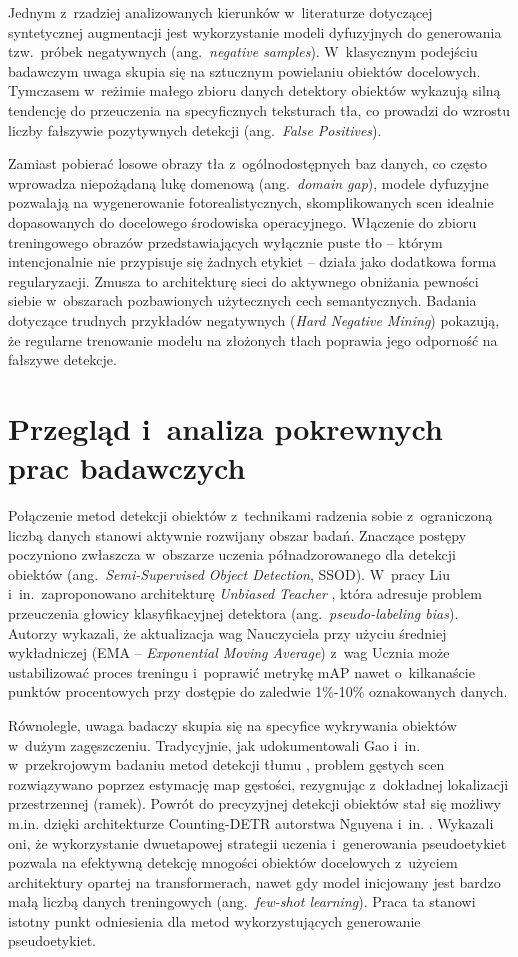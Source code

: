 Jednym z~rzadziej analizowanych kierunków w~literaturze dotyczącej syntetycznej augmentacji jest wykorzystanie modeli dyfuzyjnych do generowania tzw.\ próbek negatywnych (ang.\ \emph{negative samples}). W~klasycznym podejściu badawczym uwaga skupia się na sztucznym powielaniu obiektów docelowych. Tymczasem w~reżimie małego zbioru danych detektory obiektów wykazują silną tendencję do przeuczenia na specyficznych teksturach tła, co prowadzi do wzrostu liczby fałszywie pozytywnych detekcji (ang.\ \emph{False Positives}).

Zamiast pobierać losowe obrazy tła z~ogólnodostępnych baz danych, co często wprowadza niepożądaną lukę domenową (ang.\ \emph{domain gap}), modele dyfuzyjne pozwalają na wygenerowanie fotorealistycznych, skomplikowanych scen idealnie dopasowanych do docelowego środowiska operacyjnego. Włączenie do zbioru treningowego obrazów przedstawiających wyłącznie puste tło -- którym intencjonalnie nie przypisuje się żadnych etykiet -- działa jako dodatkowa forma regularyzacji. Zmusza to architekturę sieci do aktywnego obniżania pewności siebie w~obszarach pozbawionych użytecznych cech semantycznych. Badania dotyczące trudnych przykładów negatywnych (\emph{Hard Negative Mining}) \cite{Shrivastava2016} pokazują, że regularne trenowanie modelu na złożonych tłach poprawia jego odporność na fałszywe detekcje.

\section{Przegląd i~analiza pokrewnych prac badawczych}

Połączenie metod detekcji obiektów z~technikami radzenia sobie z~ograniczoną liczbą danych stanowi aktywnie rozwijany obszar badań. Znaczące postępy poczyniono zwłaszcza w~obszarze uczenia półnadzorowanego dla detekcji obiektów (ang.\ \emph{Semi-Supervised Object Detection}, SSOD). W~pracy Liu i~in.\ zaproponowano architekturę \emph{Unbiased Teacher} \cite{Liu2021}, która adresuje problem przeuczenia głowicy klasyfikacyjnej detektora (ang.\ \emph{pseudo-labeling bias}). Autorzy wykazali, że aktualizacja wag Nauczyciela przy użyciu średniej wykładniczej (EMA -- \emph{Exponential Moving Average}) z~wag Ucznia może ustabilizować proces treningu i~poprawić metrykę mAP nawet o~kilkanaście punktów procentowych przy dostępie do zaledwie 1\%-10\% oznakowanych danych.

Równolegle, uwaga badaczy skupia się na specyfice wykrywania obiektów w~dużym zagęszczeniu. Tradycyjnie, jak udokumentowali Gao i~in. w~przekrojowym badaniu metod detekcji tłumu \cite{Gao2020}, problem gęstych scen rozwiązywano poprzez estymację map gęstości, rezygnując z~dokładnej lokalizacji przestrzennej (ramek). Powrót do precyzyjnej detekcji obiektów stał się możliwy m.in. dzięki architekturze Counting-DETR autorstwa Nguyena i~in. \cite{Nguyen2022}. Wykazali oni, że wykorzystanie dwuetapowej strategii uczenia i~generowania pseudoetykiet pozwala na efektywną detekcję mnogości obiektów docelowych z~użyciem architektury opartej na transformerach, nawet gdy model inicjowany jest bardzo małą liczbą danych treningowych (ang.\ \emph{few-shot learning}). Praca ta stanowi istotny punkt odniesienia dla metod wykorzystujących generowanie pseudoetykiet.

